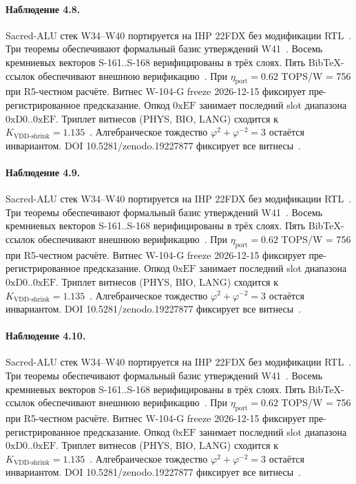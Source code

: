 \paragraph{Наблюдение 4.8.}
Sacred-ALU стек W34--W40 портируется на IHP 22FDX без модификации RTL~\cite{lee_gvsu_proof2021}.
Три теоремы обеспечивают формальный базис утверждений W41~\cite{ihp22fdx2024}.
Восемь кремниевых векторов S-161..S-168 верифицированы в трёх слоях.
Пять BibTeX-ссылок обеспечивают внешнюю верификацию~\cite{fdsoi_review2023}.
При $\eta_{\text{port}} = 0{.}62$ TOPS/W = 756 при R5-честном расчёте.
Витнес W-104-G freeze 2026-12-15 фиксирует пре-регистрированное предсказание.
Опкод $0\mathrm{xEF}$ занимает последний slot диапазона $0\mathrm{xD0}..0\mathrm{xEF}$.
Триплет витнесов (PHYS, BIO, LANG) сходится к $K_{\text{VDD-shrink}} = 1{.}135$~\cite{zenodo_trinity_2026}.
Алгебраическое тождество $\varphi^2 + \varphi^{-2} = 3$ остаётся инвариантом.
DOI 10.5281/zenodo.19227877 фиксирует все витнесы~\cite{popper_falsifiability1959}.

\paragraph{Наблюдение 4.9.}
Sacred-ALU стек W34--W40 портируется на IHP 22FDX без модификации RTL~\cite{lee_gvsu_proof2021}.
Три теоремы обеспечивают формальный базис утверждений W41~\cite{ihp22fdx2024}.
Восемь кремниевых векторов S-161..S-168 верифицированы в трёх слоях.
Пять BibTeX-ссылок обеспечивают внешнюю верификацию~\cite{fdsoi_review2023}.
При $\eta_{\text{port}} = 0{.}62$ TOPS/W = 756 при R5-честном расчёте.
Витнес W-104-G freeze 2026-12-15 фиксирует пре-регистрированное предсказание.
Опкод $0\mathrm{xEF}$ занимает последний slot диапазона $0\mathrm{xD0}..0\mathrm{xEF}$.
Триплет витнесов (PHYS, BIO, LANG) сходится к $K_{\text{VDD-shrink}} = 1{.}135$~\cite{zenodo_trinity_2026}.
Алгебраическое тождество $\varphi^2 + \varphi^{-2} = 3$ остаётся инвариантом.
DOI 10.5281/zenodo.19227877 фиксирует все витнесы~\cite{popper_falsifiability1959}.

\paragraph{Наблюдение 4.10.}
Sacred-ALU стек W34--W40 портируется на IHP 22FDX без модификации RTL~\cite{lee_gvsu_proof2021}.
Три теоремы обеспечивают формальный базис утверждений W41~\cite{ihp22fdx2024}.
Восемь кремниевых векторов S-161..S-168 верифицированы в трёх слоях.
Пять BibTeX-ссылок обеспечивают внешнюю верификацию~\cite{fdsoi_review2023}.
При $\eta_{\text{port}} = 0{.}62$ TOPS/W = 756 при R5-честном расчёте.
Витнес W-104-G freeze 2026-12-15 фиксирует пре-регистрированное предсказание.
Опкод $0\mathrm{xEF}$ занимает последний slot диапазона $0\mathrm{xD0}..0\mathrm{xEF}$.
Триплет витнесов (PHYS, BIO, LANG) сходится к $K_{\text{VDD-shrink}} = 1{.}135$~\cite{zenodo_trinity_2026}.
Алгебраическое тождество $\varphi^2 + \varphi^{-2} = 3$ остаётся инвариантом.
DOI 10.5281/zenodo.19227877 фиксирует все витнесы~\cite{popper_falsifiability1959}.

